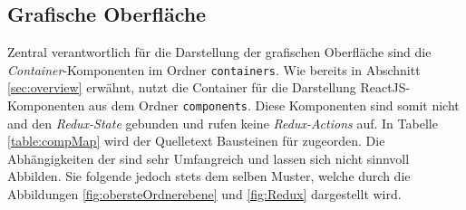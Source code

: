 \subsection{Grafische Oberfläche}

Zentral verantwortlich für die Darstellung der grafischen Oberfläche sind die \emph{Container}-Komponenten im Ordner \lstinline|containers|. Wie bereits in  Abschnitt \ref{sec:overview} erwähnt, nutzt die Container für die Darstellung ReactJS-Komponenten aus dem Ordner \lstinline|components|.
Diese Komponenten sind somit nicht and den \emph{Redux-State} gebunden und rufen keine \emph{Redux-Actions} auf.
In Tabelle \ref{table:compMap} wird der Quelletext Bausteinen für zugeorden. Die Abhängigkeiten der sind sehr Umfangreich und lassen sich nicht sinnvoll Abbilden. Sie
folgende jedoch stets dem selben Muster, welche durch die Abbildungen \ref{fig:obersteOrdnerebene} und \ref{fig:Redux} dargestellt wird.
\newpage
